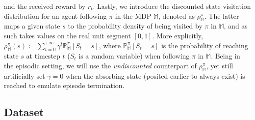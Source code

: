 and the received reward by $r_t$.
Lastly, we introduce the discounted state visitation distribution for an agent following $\pi$
in the MDP $\mathbb{M}$, denoted as $\rho^\pi_\mathbb{M}$.
The latter maps a given state $s$ to the probability density of being visited by $\pi$ in $\mathbb{M}$,
and as such takes values on the real unit segment $[0,1]$.
More explicitly,
$\rho^\pi_\mathbb{M} (s)
\coloneqq
\sum_{t=0}^{+\infty} \gamma^t \mathbb{P}^\pi_\mathbb{M} [S_t=s]$,
where $\mathbb{P}^\pi_\mathbb{M} [S_t=s]$ is the probability of reaching state $s$
at timestep $t$ ($S_t$ is a random variable) when following $\pi$ in $\mathbb{M}$.
Being in the episodic setting, we will use the \emph{undiscounted} counterpart of $\rho^\pi_\mathbb{M}$,
yet still artificially set $\gamma=0$ when the absorbing state (posited earlier to always exist)
is reached to emulate episode termination.

\subsection*{Dataset}

